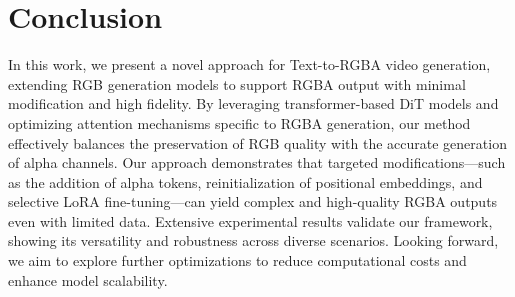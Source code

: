 \section{Conclusion}
\label{sec:conclusion}
In this work, we present a novel approach for Text-to-RGBA video generation, extending RGB generation models to support RGBA output with minimal modification and high fidelity. By leveraging transformer-based DiT models and optimizing attention mechanisms specific to RGBA generation, our method effectively balances the preservation of RGB quality with the accurate generation of alpha channels. Our approach demonstrates that targeted modifications—such as the addition of alpha tokens, reinitialization of positional embeddings, and selective LoRA fine-tuning—can yield complex and high-quality RGBA outputs even with limited data. Extensive experimental results validate our framework, showing its versatility and robustness across diverse scenarios. Looking forward, we aim to explore further optimizations to reduce computational costs and enhance model scalability.